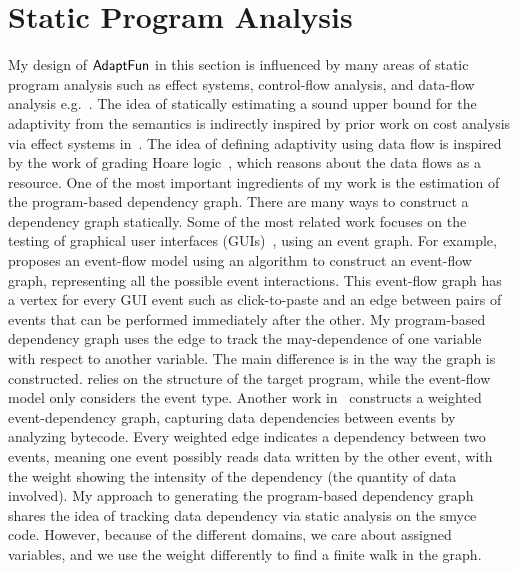 \section{Static Program Analysis}
\label{sec:relatedwork-adapt-static}
My design of $\textsf{AdaptFun}$ in this section is influenced by many areas of static program analysis such as 
effect systems, control-flow analysis, and data-flow analysis e.g.~\cite{BurkeR90}. 
The idea of statically estimating a sound upper bound for the adaptivity from the semantics is indirectly inspired by prior work on cost analysis via effect systems in~\cite{CicekBG0H17, RadicekBG0Z18, QuG019}. The idea of defining adaptivity using data flow is inspired by the work of grading 
Hoare logic~\cite{GaboardiKOS21}, which reasons about the data flows as a resource. 
%
One of the most important ingredients of my work is the estimation of the program-based dependency graph.
There are many ways to construct a dependency graph statically.
Some of the most related work focuses on the testing of graphical user interfaces (GUIs)~\cite{Belli01, ArltPBSBM12, Memon07}, using an event graph. For example, \citet{Memon07} proposes an event-flow model using an algorithm to construct an event-flow graph, representing all the possible event interactions. 
This event-flow graph has a vertex for every GUI event such as click-to-paste and an edge between pairs of events that can be performed immediately after the other. My program-based dependency graph uses the edge to track the may-dependence of one variable with respect to another variable. 
The main difference is in the way the graph is constructed. {\THESYSTEM} relies on the structure of the target program, while the event-flow model only considers the event type. 
Another work in~\citet{ArltPBSBM12} constructs a weighted event-dependency graph, capturing data dependencies between events by analyzing bytecode. 
Every weighted edge indicates a dependency between two events, meaning one event possibly reads data written by the other event, with the weight showing the intensity of the dependency (the quantity of data involved). 
My approach to generating the program-based dependency graph shares the idea of tracking data dependency via static analysis on the smyce code. 
However, because of the different domains, we care about assigned variables, and we use the weight differently to find a finite walk in the graph.

